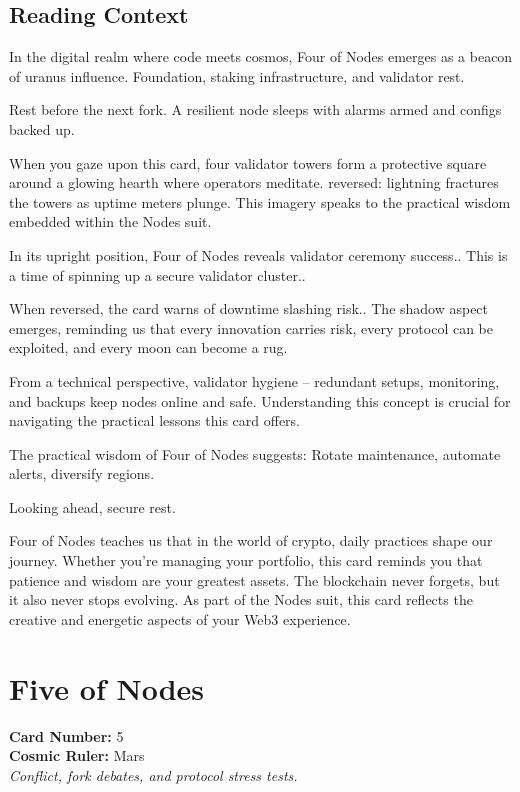\documentclass[11pt,oneside]{book}
\begin{document}
\begin{minipage}[t]{0.55\textwidth}
  \subsection*{Reading Context}
  In the digital realm where code meets cosmos, Four of Nodes emerges as a beacon of uranus influence. Foundation, staking infrastructure, and validator rest.

  Rest before the next fork. A resilient node sleeps with alarms armed and configs backed up.

  When you gaze upon this card, four validator towers form a protective square around a glowing hearth where operators meditate. reversed: lightning fractures the towers as uptime meters plunge. This imagery speaks to the practical wisdom embedded within the Nodes suit.

  In its upright position, Four of Nodes reveals validator ceremony success.. This is a time of spinning up a secure validator cluster..

  When reversed, the card warns of downtime slashing risk.. The shadow aspect emerges, reminding us that every innovation carries risk, every protocol can be exploited, and every moon can become a rug.

  From a technical perspective, validator hygiene – redundant setups, monitoring, and backups keep nodes online and safe. Understanding this concept is crucial for navigating the practical lessons this card offers.

  The practical wisdom of Four of Nodes suggests: Rotate maintenance, automate alerts, diversify regions.

  Looking ahead, secure rest.

  Four of Nodes teaches us that in the world of crypto, daily practices shape our journey. Whether you're managing your portfolio, this card reminds you that patience and wisdom are your greatest assets. The blockchain never forgets, but it also never stops evolving. As part of the Nodes suit, this card reflects the creative and energetic aspects of your Web3 experience.

\end{minipage}

\newpage
\section*{Five of Nodes}

\begin{minipage}[t]{0.55\textwidth}
  \vspace{0pt}
  \textbf{Card Number:} 5\\  \textbf{Cosmic Ruler:} Mars\\  \textit{Conflict, fork debates, and protocol stress tests.}
\end{minipage}
\end{document}
